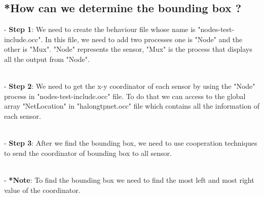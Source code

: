 \documentclass{article}
\begin{document}
\subsection{*How can we determine the bounding box ?}

- \textbf{Step 1}: We need to create the behaviour file whose name is "nodes-test-include.occ". In this file, we need to add two processes one is "Node" and the other is "Mux". "Node" represents the sensor, "Mux" is the process that displays all the output from "Node".

\\[2\baselineskip]

- \textbf{Step 2}: We need to get the x-y coordinator of each sensor by using the "Node" process in "nodes-test-include.occ" file. To do that we can access to the global array "NetLocation" in "halongtpnet.occ" file which contains all the information of each sensor.

\\[2\baselineskip]

- \textbf{Step 3}: After we find the bounding box, we need to use cooperation techniques to send the coordinator of bounding box to all sensor.

\\[2\baselineskip]

- \textbf{*Note}: To find the bounding box we need to find the most left and most right value of the coordinator.

\\[1\baselineskip]
\end{document}
